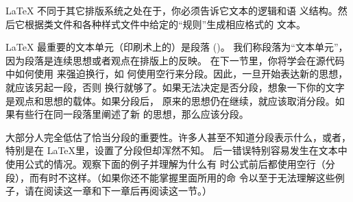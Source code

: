 \LaTeX{} 不同于其它排版系统之处在于，你必须告诉它文本的逻辑和语
义结构。然后它根据类文件和各种样式文件中给定的“规则”生成相应格式的
文本。

\LaTeX{} 最重要的文本单元（印刷术上的）是段落 ()。
我们称段落为“文本单元”，因为段落是连续思想或者观点在排版上的反映。
在下一节里，你将学会在源代码中如何使用 \texttt{\bs\bs} 来强迫换行，如
何使用空行来分段。因此，一旦开始表达新的思想，就应该另起一段，否则
换行就够了。如果无法决定是否分段，想象一下你的文字是观点和思想的载体。如果分段后，
原来的思想仍在继续，就应该取消分段。如果有些行在同一段落里阐述了新
的思想，那么应该分段。

大部分人完全低估了恰当分段的重要性。许多人甚至不知道分段表示什么，或者，
特别是在 \LaTeX 里，设置了分段但却浑然不知。
后一错误特别容易发生在文本中使用公式的情况。观察下面的例子并理解为什么有
时公式前后都使用空行（分段），而有时不这样。（如果你还不能掌握里面所用的命
令以至于无法理解这些例子，请在阅读这一章和下一章后再阅读这一节。）

